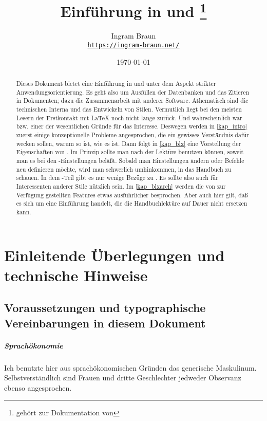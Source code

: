 \documentclass[
	11pt,        %
	table,       %
	twoside,     %
	notitlepage, %
]{scrreprt}
\title{Einführung in \blx{} und \archbib\thanks{gehört zur Dokumentation von \archbib{~v.2.3.0}}}
\author{Ingram Braun\\\href{https://ingram-braun.net/}{\texttt{https://ingram-braun.net/}}}
\date{\today}
\makeatletter
\newcommand{\IfTeXforHt}[2]{\ifdefined\HCode#1\else#2\fi} %
\newcommand*{\TeXPaket}{Paket (\protect\texlogo)!}
\let\latexlogo\LaTeX
\renewcommand*{\LaTeX}{\latexlogo\index{\TeXPaket LaTeX@\protect\latexlogo}}
\let\texlogo\TeX
\renewcommand*{\TeX}{\texlogo\index{\TeXPaket TeX@\protect\texlogo}}
\makeatother
\begin{document}
\IfTeXforHt{}{\maketitle}

\begin{abstract}
Dieses Dokument bietet eine Einführung in \blx{} und \archbib{} unter dem Aspekt strikter Anwendungsorientierung. Es geht also um Ausfüllen der
Datenbanken und das Zitieren in Dokumenten; dazu die Zusammenarbeit mit anderer Software. Athematisch sind die technischen Interna und
das Entwickeln von Stilen.
Vermutlich liegt bei den meisten Lesern der Erstkontakt mit \LaTeX{} noch nicht lange zurück. Und wahrscheinlich war \blx{} bzw. \archbib{} einer der wesentlichen Gründe für das Interesse. Deswegen werden in \cref{kap_intro} zuerst einige konzeptionelle Probleme angesprochen, die ein gewisses Verständnis dafür wecken sollen, warum \blx{} so ist, wie es ist. Dann folgt in \cref{kap_blx} eine Vorstellung der Eigenschaften von \blx. Im Prinzip sollte man nach der Lektüre \blx{} benutzen können, soweit man es bei den -Einstellungen beläßt. Sobald man Einstellungen ändern oder Befehle neu definieren möchte, wird man schwerlich umhinkommen, in das Handbuch zu schauen. In dem \blx-Teil gibt es nur wenige Bezüge zu \archbib. Es sollte also auch für Interessenten anderer Stile nützlich sein. Im \cref{kap_blxarch} werden die von \archbib{} zur Verfügung gestellten Features etwas ausführlicher besprochen. Aber auch hier gilt, daß es sich um eine Einführung handelt, die die Handbuchlektüre auf Dauer nicht ersetzen kann.
\end{abstract}
 
\tableofcontents

\chapter{Einleitende Überlegungen und technische Hinweise}\label{kap_intro}

\section{Voraussetzungen und typographische Vereinbarungen in diesem Dokument}

\paragraph{Sprachökonomie} Ich benutzte hier aus sprachökonomischen Gründen das generische Maskulinum. Selbstverständlich sind Frauen und dritte Geschlechter jedweder Observanz ebenso angesprochen.
\end{document}
